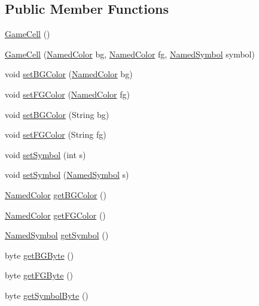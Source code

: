 \subsection*{Public Member Functions}
\begin{DoxyCompactItemize}
\item 
\mbox{\hyperlink{classbridges_1_1base_1_1_game_cell_a59a4bedeb15c55b71998635520eae21e}{Game\+Cell}} ()
\item 
\mbox{\hyperlink{classbridges_1_1base_1_1_game_cell_aa8c18bc86d5595a6372dbdda66add0fd}{Game\+Cell}} (\mbox{\hyperlink{enumbridges_1_1base_1_1_named_color}{Named\+Color}} bg, \mbox{\hyperlink{enumbridges_1_1base_1_1_named_color}{Named\+Color}} fg, \mbox{\hyperlink{enumbridges_1_1base_1_1_named_symbol}{Named\+Symbol}} symbol)
\item 
void \mbox{\hyperlink{classbridges_1_1base_1_1_game_cell_aa29ae1568daddbc1ca5eec2155385f10}{set\+B\+G\+Color}} (\mbox{\hyperlink{enumbridges_1_1base_1_1_named_color}{Named\+Color}} bg)
\item 
void \mbox{\hyperlink{classbridges_1_1base_1_1_game_cell_af01906e011187218bddf63ddce8c42eb}{set\+F\+G\+Color}} (\mbox{\hyperlink{enumbridges_1_1base_1_1_named_color}{Named\+Color}} fg)
\item 
void \mbox{\hyperlink{classbridges_1_1base_1_1_game_cell_a60805632dec196bfbae6a4de40171447}{set\+B\+G\+Color}} (String bg)
\item 
void \mbox{\hyperlink{classbridges_1_1base_1_1_game_cell_a3ffaf3300d8196a92d46e7c88ae32a86}{set\+F\+G\+Color}} (String fg)
\item 
void \mbox{\hyperlink{classbridges_1_1base_1_1_game_cell_a5e6b4ed374ed3ec4bd6e72723e94848e}{set\+Symbol}} (int s)
\item 
void \mbox{\hyperlink{classbridges_1_1base_1_1_game_cell_a246ba3b4a56f2e440ac21fb0ba297e06}{set\+Symbol}} (\mbox{\hyperlink{enumbridges_1_1base_1_1_named_symbol}{Named\+Symbol}} s)
\item 
\mbox{\hyperlink{enumbridges_1_1base_1_1_named_color}{Named\+Color}} \mbox{\hyperlink{classbridges_1_1base_1_1_game_cell_a7e910723cc5a678ef75f24f993b0c2ca}{get\+B\+G\+Color}} ()
\item 
\mbox{\hyperlink{enumbridges_1_1base_1_1_named_color}{Named\+Color}} \mbox{\hyperlink{classbridges_1_1base_1_1_game_cell_a9355404eb09017ca7ee3e90490e1d13b}{get\+F\+G\+Color}} ()
\item 
\mbox{\hyperlink{enumbridges_1_1base_1_1_named_symbol}{Named\+Symbol}} \mbox{\hyperlink{classbridges_1_1base_1_1_game_cell_a5c5ce5b363e442ac10c8588cbec77511}{get\+Symbol}} ()
\item 
byte \mbox{\hyperlink{classbridges_1_1base_1_1_game_cell_ad431b73e9e0c9e4b0ab539468e8d3a58}{get\+B\+G\+Byte}} ()
\item 
byte \mbox{\hyperlink{classbridges_1_1base_1_1_game_cell_ad1a05ce3e8ca8e148d867e6248023253}{get\+F\+G\+Byte}} ()
\item 
byte \mbox{\hyperlink{classbridges_1_1base_1_1_game_cell_a6b5589c577f2d89c0e98436eea667d77}{get\+Symbol\+Byte}} ()
\end{DoxyCompactItemize}
